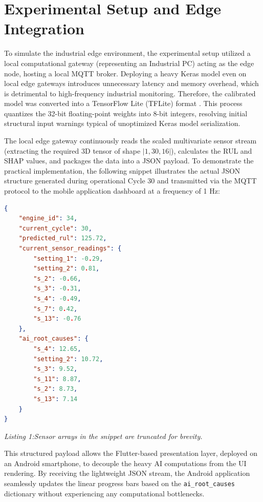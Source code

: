 \documentclass[journal]{IEEEtran}
\begin{document}
\section{Experimental Setup and Edge Integration}

To simulate the industrial edge environment, the experimental setup utilized a local computational gateway (representing an Industrial PC) acting as the edge node, hosting a local MQTT broker. Deploying a heavy Keras model even on local edge gateways introduces unnecessary latency and memory overhead, which is detrimental to high-frequency industrial monitoring. Therefore, the calibrated model was converted into a TensorFlow Lite (TFLite) format \cite{david2021}. This process quantizes the 32-bit floating-point weights into 8-bit integers, resolving initial structural input warnings typical of unoptimized Keras model serialization.

The local edge gateway continuously reads the scaled multivariate sensor stream (extracting the required 3D tensor of shape $|1, 30, 16|$), calculates the RUL and SHAP values, and packages the data into a JSON payload. To demonstrate the practical implementation, the following snippet illustrates the actual JSON structure generated during operational Cycle 30 and transmitted via the MQTT protocol to the mobile application dashboard at a frequency of 1 Hz:

\begin{lstlisting}[language=json]
{
    "engine_id": 34,
    "current_cycle": 30,
    "predicted_rul": 125.72,
    "current_sensor_readings": {
        "setting_1": -0.29,
        "setting_2": 0.81,
        "s_2": -0.66,
        "s_3": -0.31,
        "s_4": -0.49,
        "s_7": 0.42,
        "s_13": -0.76
    },
    "ai_root_causes": {
        "s_4": 12.65,
        "setting_2": 10.72,
        "s_3": 9.52,
        "s_11": 8.87,
        "s_2": 8.73,
        "s_13": 7.14
    }
}
\end{lstlisting}
\vspace{-1mm}
\textit{Listing 1:Sensor arrays in the snippet are truncated for brevity.}

This structured payload allows the Flutter-based presentation layer, deployed on an Android smartphone, to decouple the heavy AI computations from the UI rendering. By receiving the lightweight JSON stream, the Android application seamlessly updates the linear progress bars based on the \texttt{ai\_root\_causes} dictionary without experiencing any computational bottlenecks.
\end{document}
